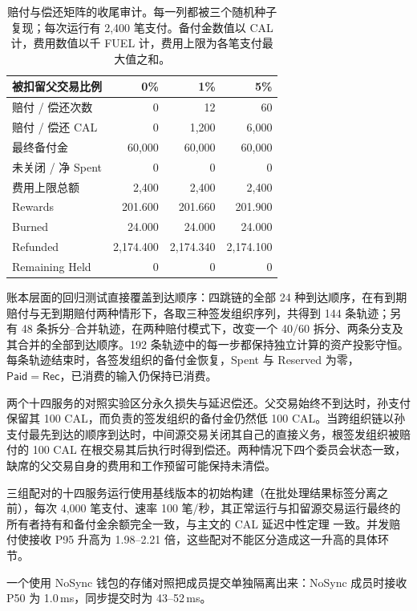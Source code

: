 \begin{table}[t]
  \caption{赔付与偿还矩阵的收尾审计。每一列都被三个随机种子复现；每次运行有 2,400 笔支付。备付金数值以 CAL 计，费用数值以千 FUEL 计，费用上限为各笔支付最大值之和。}
  \label{archive:tab:eval-audit}
  \centering
  \small
  \begin{tabular}{@{}lrrr@{}}
    \toprule
    被扣留父交易比例 & 0\% & 1\% & 5\% \\
    \midrule
    赔付 / 偿还次数 & 0 & 12 & 60 \\
    赔付 / 偿还 CAL & 0 & 1,200 & 6,000 \\
    最终备付金 & 60,000 & 60,000 & 60,000 \\
    未关闭 / 净 Spent & 0 & 0 & 0 \\
    费用上限总额 & 2,400 & 2,400 & 2,400 \\
    Rewards & 201.600 & 201.660 & 201.900 \\
    Burned & 24.000 & 24.000 & 24.000 \\
    Refunded & 2,174.400 & 2,174.340 & 2,174.100 \\
    Remaining Held & 0 & 0 & 0 \\
    \bottomrule
  \end{tabular}
\end{table}

账本层面的回归测试直接覆盖到达顺序：四跳链的全部 24 种到达顺序，在有到期赔付与无到期赔付两种情形下，各取三种签发组织序列，共得到 144 条轨迹；另有 48 条拆分--合并轨迹，在两种赔付模式下，改变一个 40/60 拆分、两条分支及其合并的全部到达顺序。192 条轨迹中的每一步都保持独立计算的资产投影守恒。每条轨迹结束时，各签发组织的备付金恢复，Spent 与 Reserved 为零，$\mathsf{Paid}=\mathsf{Rec}$，已消费的输入仍保持已消费。

两个十四服务的对照实验区分永久损失与延迟偿还。父交易始终不到达时，孙支付保留其 100 CAL，而负责的签发组织的备付金仍然低 100 CAL。当跨组织链以孙支付最先到达的顺序到达时，中间源交易关闭其自己的直接义务，根签发组织被赔付的 100 CAL 在根交易其后执行时得到偿还。两种情况下四个委员会状态一致，缺席的父交易自身的费用和工作预留可能保持未清偿。

三组配对的十四服务运行使用基线版本的初始构建（在批处理结果标签分离之前），每次 4,000 笔支付、速率 100 笔/秒，其正常运行与扣留源交易运行最终的所有者持有和备付金余额完全一致，与主文的 CAL 延迟中性定理 一致。并发赔付使接收 P95 升高为 1.98--2.21 倍，这些配对不能区分造成这一升高的具体环节。

一个使用 NoSync 钱包的存储对照把成员提交单独隔离出来：NoSync 成员时接收 P50 为 1.0\,ms，同步提交时为 43--52\,ms。

